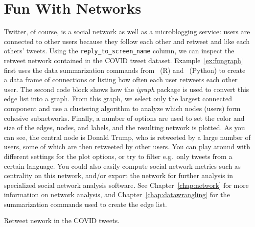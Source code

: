 

\section{Fun With Networks}\label{sec:funnet}

Twitter, of course, is a social network as well as a microblogging service:
users are connected to other users because they follow each other and retweet and like each others' tweets.
Using the \verb+reply_to_screen_name+ column, we can inspect the retweet network contained in the COVID tweet dataset.
Example~\ref{ex:fungraph} first uses the data summarization commands from \tidyverse\ (R) and \pandas\ (Python) to
create a data frame of connections or  listing how often each user retweets each other user.
The second code block shows how the \emph{igraph} package is used to convert this edge list into a graph.
From this graph, we select only the largest connected component and use a clustering algorithm to analyze which
nodes (users) form cohesive subnetworks.
Finally, a number of options are used to set the color and size of the edges, nodes, and labels,
and the resulting network is plotted.
As you can see, the central node is Donald Trump, who is retweeted by a large number of users,
some of which are then retweeted by other users.
You can play around with different settings for the plot options,
or try to filter e.g.\ only tweets from a certain language. 
You could also easily compute social network metrics such as centrality on this network,
and/or export the network for further analysis in specialized social network analysis software.
See Chapter~\ref{chap:network} for more information on network analysis,
and Chapter~\ref{chap:datawrangling} for the summarization commands used to create the edge list.

\begin{ccsexample}
\caption{Retweet nework in the COVID tweets.}\label{ex:fungraph}
\end{ccsexample}

